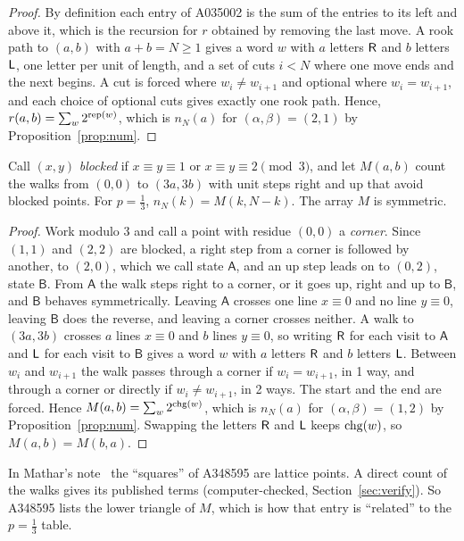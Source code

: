 \begin{proof}
By definition each entry of A035002 is the sum of the entries to its left and above it, which is the
recursion for $r$ obtained by removing the last move. A rook path to $(a,b)$ with $a+b=N\ge1$ gives
a word $w$ with $a$ letters $\mathsf R$ and $b$ letters $\mathsf L$, one letter per unit of length, and a set of
cuts $i<N$ where one move ends and the next begins. A cut is forced where $w_i\ne w_{i+1}$ and
optional where $w_i=w_{i+1}$, and each choice of optional cuts gives exactly one rook path. Hence,
$r(a,b)=\sum_w2^{\operatorname{rep}(w)}$, which is $n_N(a)$ for $(\alpha,\beta)=(2,1)$ by
Proposition~\ref{prop:num}.
\end{proof}

\begin{theorem}[$p=\tfrac13$ and Mathar's blocked walks]\label{thm:mathar}
Call $(x,y)$ \emph{blocked} if $x\equiv y\equiv1$ or $x\equiv y\equiv2\pmod 3$, and let $M(a,b)$
count the walks from $(0,0)$ to $(3a,3b)$ with unit steps right and up that avoid blocked points.
For $p=\tfrac13$, $n_N(k)=M(k,N-k)$. The array $M$ is symmetric.
\end{theorem}

\begin{proof}
Work modulo $3$ and call a point with residue $(0,0)$ a \emph{corner}. Since $(1,1)$ and $(2,2)$ are
blocked, a right step from a corner is followed by another, to $(2,0)$, which we call state
$\mathsf A$, and an up step leads on to $(0,2)$, state $\mathsf B$. From $\mathsf A$ the walk steps
right to a corner, or it goes up, right and up to $\mathsf B$, and $\mathsf B$ behaves symmetrically. Leaving
$\mathsf A$ crosses one line $x\equiv0$ and no line $y\equiv0$, leaving $\mathsf B$ does the
reverse, and leaving a corner crosses neither. A walk to $(3a,3b)$ crosses $a$ lines $x\equiv0$ and
$b$ lines $y\equiv0$, so writing $\mathsf R$ for each visit to $\mathsf A$ and $\mathsf L$ for each visit
to $\mathsf B$ gives a word $w$ with $a$ letters $\mathsf R$ and $b$ letters $\mathsf L$. Between $w_i$ and $w_{i+1}$
the walk passes through a corner if $w_i=w_{i+1}$, in 1 way, and through a corner or directly if
$w_i\ne w_{i+1}$, in 2 ways. The start and the end are forced. Hence $M(a,b)=\sum_w2^{\operatorname{chg}(w)}$,
which is $n_N(a)$ for $(\alpha,\beta)=(1,2)$ by Proposition~\ref{prop:num}. Swapping the letters
$\mathsf R$ and $\mathsf L$ keeps $\operatorname{chg}(w)$, so $M(a,b)=M(b,a)$.
\end{proof}

In Mathar's note~\cite{mathar2022} the ``squares'' of A348595 are lattice points. A direct count
of the walks gives its published terms (computer-checked, Section~\ref{sec:verify}). So A348595
lists the lower triangle of $M$, which is how that entry is ``related'' to the $p=\tfrac13$ table.
